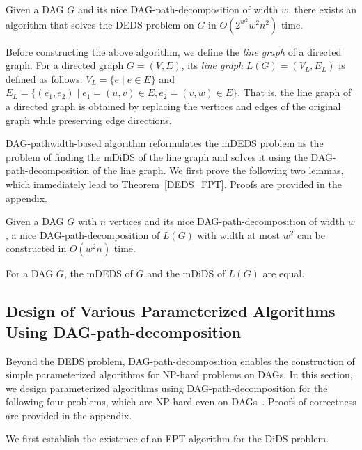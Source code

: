 \documentclass[runningheads]{llncs}
\theoremstyle{plain}
\theoremstyle{definition}
\begin{document}
\begin{theorem}\label{DEDS_FPT}
    Given a DAG \(G\) and its nice DAG-path-decomposition of width \(w\), there exists an algorithm that solves the DEDS problem on \(G\) in \(O(2^{w^2} w^2 n^2)\) time.  
\end{theorem}

Before constructing the above algorithm, we define the \emph{line graph} of a directed graph.  
For a directed graph \(G = (V, E)\), its \emph{line graph} \(L(G) = (V_L, E_L)\) is defined as follows:  
\(V_L = \{e \mid e \in E\}\) and \(E_L = \{(e_1, e_2) \mid e_1 = (u, v) \in E, e_2 = (v, w) \in E\}\).  
That is, the line graph of a directed graph is obtained by replacing the vertices and edges of the original graph while preserving edge directions.  

DAG-pathwidth-based algorithm reformulates the mDEDS problem as the problem of finding the mDiDS of the line graph and solves it using the DAG-path-decomposition of the line graph.  
We first prove the following two lemmas, which immediately lead to Theorem~\ref{DEDS_FPT}.  
Proofs are provided in the appendix.  

\begin{lemma}\label{DAG_path_decomposition(L(G))}
    Given a DAG \(G\) with \(n\) vertices and its nice DAG-path-decomposition of width \(w\), a nice DAG-path-decomposition of \(L(G)\) with width at most \(w^2\) can be constructed in \(O(w^2 n)\) time.  
\end{lemma}

\begin{lemma}\label{mDEDS_mDiDS}
    For a DAG \(G\), the mDEDS of \(G\) and the mDiDS of \(L(G)\) are equal.  
\end{lemma}





\subsection{Design of Various Parameterized Algorithms Using DAG-path-decomposition}

Beyond the DEDS problem, DAG-path-decomposition enables the construction of simple parameterized algorithms for NP-hard problems on DAGs.  
In this section, we design parameterized algorithms using DAG-path-decomposition for the following four problems, which are NP-hard even on DAGs~\cite{art17}.  
Proofs of correctness are provided in the appendix.  

We first establish the existence of an FPT algorithm for the DiDS problem.  
\end{document}
